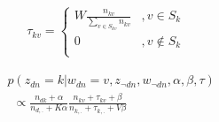 \documentclass{sig-alternate-05-2015}
\begin{document}
\begin{equation}
\label{eq:wikiPrior}
\begin{aligned}
\tau_{kv}=
\left\{ \begin{aligned}
W \frac{n_{kv}}{\sum_{v\in S_{kv}}n_{kv}} &,v\in S_{k} \\
0&,v \notin S_{k}\\
\end{aligned}\right.
\end{aligned}
\end{equation}

\begin{equation}
\label{eq:LDAgibbs}
\begin{aligned}
&p(z_{dn}=k|w_{dn}=v,z_{\neg{dn}},w_{\neg{dn}},\alpha,\beta,\tau)\\
&\ \ \propto \frac{n_{dk}+\alpha}{n_{d,.}+K\alpha}\frac{n_{kv}+\tau_{kv}+\beta}{n_{k,.}+\tau_{k,.}+V\beta}
\end{aligned}
\end{equation}

\end{document}

